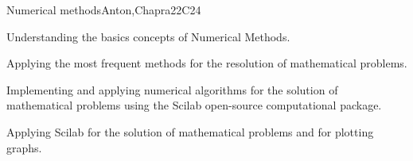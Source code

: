 \begin{syllabus}
\begin{unit}{Numerical methods}{}{Anton,Chapra}{22}{C24}
   \begin{learningoutcomes}
      \item Understanding the basics concepts of Numerical Methods.
      \item Applying the most frequent methods for the resolution of mathematical problems.
      \item Implementing and applying numerical algorithms for the solution of mathematical problems using the Scilab open-source computational package.
      \item Applying Scilab for the solution of mathematical problems and for plotting graphs.
   \end{learningoutcomes}
\end{unit}

\begin{coursebibliography}
\end{coursebibliography}

\end{syllabus}

